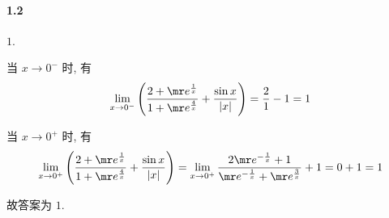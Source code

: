 \paragraph*{1.2} $1$.

当 $x\to 0^{-}$ 时, 有
\[
	\lim_{x\to 0^{-}}\left(\dfrac{2+\mr e^{\frac{1}{x}}}{1+\mr e^\frac{4}{x}}+\dfrac{\sin x}{|x|}\right)=\dfrac{2}{1}-1=1
\]

当 $x\to 0^{+}$ 时, 有
\[
	\lim_{x\to 0^{+}}\left(\dfrac{2+\mr e^{\frac{1}{x}}}{1+\mr e^\frac{4}{x}}+\dfrac{\sin x}{|x|}\right)=\lim_{x\to 0^{+}}\dfrac{2\mr e^{-\frac{1}{x}}+1}{\mr e^{-\frac{1}{x}}+\mr e^{\frac{3}{x}}}+1=0+1=1
\]

故答案为 $1$.
